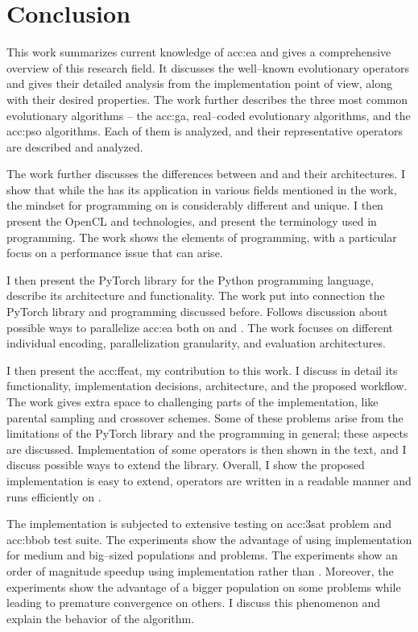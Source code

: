 \chapter{Conclusion}
\label{chap:conclusion}

This work summarizes current knowledge of \acrlong*{acc:ea} and gives a comprehensive overview of this research field. It discusses the well--known evolutionary operators and gives their detailed analysis from the implementation point of view, along with their desired properties. The work further describes the three most common evolutionary algorithms -- the \acrlong{acc:ga}, real--coded evolutionary algorithms, and the \acrlong{acc:pso} algorithms. Each of them is analyzed, and their representative operators are described and analyzed.

The work further discusses the differences between \cpu and \gpu and their architectures. I show that while the \gpu has its application in various fields mentioned in the work, the mindset for programming on \gpu is considerably different and unique. I then present the OpenCL and \cuda technologies, and present the terminology used in \gpu programming. The work shows the elements of \cuda programming, with a particular focus on a performance issue that can arise. 

I then present the PyTorch library for the Python programming language, describe its architecture and functionality. The work put into connection the PyTorch library and \cuda programming discussed before. Follows discussion about possible ways to parallelize \acrlong{acc:ea} both on \cpu and \gpuns. The work focuses on different individual encoding, parallelization granularity, and evaluation architectures.

I then present the \acrfull{acc:ffeat}, my contribution to this work. I discuss in detail its functionality, implementation decisions, architecture, and the proposed workflow. The work gives extra space to challenging parts of the implementation, like parental sampling and crossover schemes. Some of these problems arise from the limitations of the PyTorch library and the \cuda programming in general; these aspects are discussed. Implementation of some operators is then shown in the text, and I discuss possible ways to extend the library. Overall, I show the proposed implementation is easy to extend, operators are written in a readable manner and runs efficiently on \gpuns.

The implementation is subjected to extensive testing on \acrshort{acc:3sat} problem and \acrshort{acc:bbob} test suite. The experiments show the advantage of using \cuda implementation for medium and big--sized populations and problems. The experiments show an order of magnitude speedup using \cuda implementation rather than \cpuns. Moreover, the experiments show the advantage of a bigger population on some problems while leading to premature convergence on others. I discuss this phenomenon and explain the behavior of the algorithm.

